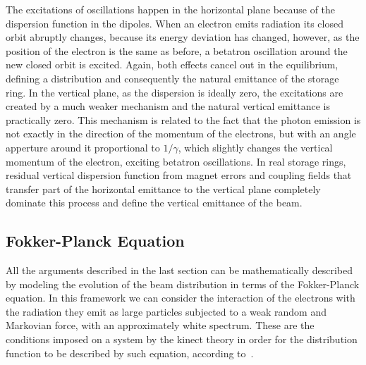     The excitations of oscillations happen in the horizontal plane because of the dispersion function in the dipoles. When an electron emits radiation its closed orbit abruptly changes, because its energy deviation has changed, however, as the position of the electron is the same as before, a betatron oscillation around the new closed orbit is excited. Again, both effects cancel out in the equilibrium, defining a distribution and consequently the natural emittance of the storage ring. In the vertical plane, as the dispersion is ideally zero, the excitations are created by a much weaker mechanism and the natural vertical emittance is practically zero. This mechanism is related to the fact that the photon emission is not exactly in the direction of the momentum of the electrons, but with an angle apperture around it proportional to $1/\gamma$, which slightly changes the vertical momentum of the electron, exciting betatron oscillations. In real storage rings, residual vertical dispersion function from magnet errors and coupling fields that transfer part of the horizontal emittance to the vertical plane completely dominate this process and define the vertical emittance of the beam.

\subsection{Fokker-Planck Equation}\label{ssec:fokker_planck_equation}

	All the arguments described in the last section can be mathematically described by modeling the evolution of the beam distribution in terms of the Fokker-Planck equation. In this framework we can consider the interaction of the electrons with the radiation they emit as large particles subjected to a weak random and Markovian force, with an approximately white spectrum. These are the conditions imposed on a system by the kinect theory in order for the distribution function to be described by such equation, according to~.

